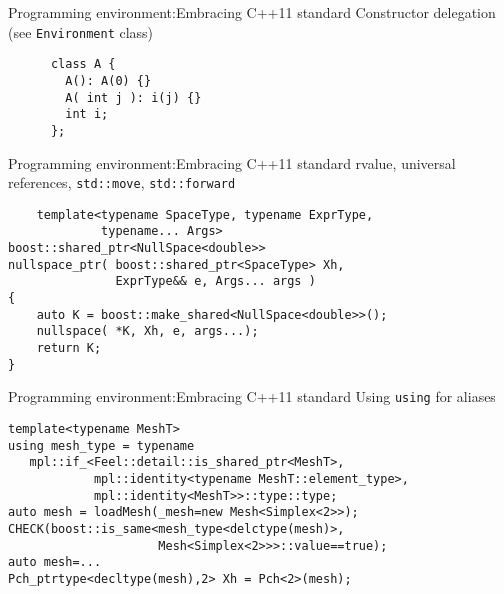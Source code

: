 \begin{frame}[fragile]{Programming environment:Embracing C++11 standard}
    Constructor delegation (see \texttt{Environment} class)

    \begin{verbatim}
      class A {
        A(): A(0) {}
        A( int j ): i(j) {}
        int i;
      };
    \end{verbatim}
\end{frame}

\begin{frame}[fragile]{Programming environment:Embracing C++11 standard }
  rvalue, universal references, \texttt{std::move},
  \texttt{std::forward}
  \begin{verbatim}
    template<typename SpaceType, typename ExprType,
             typename... Args>
boost::shared_ptr<NullSpace<double>>
nullspace_ptr( boost::shared_ptr<SpaceType> Xh,
               ExprType&& e, Args... args )
{
    auto K = boost::make_shared<NullSpace<double>>();
    nullspace( *K, Xh, e, args...);
    return K;
}
  \end{verbatim}
\end{frame}

\begin{frame}[fragile]{Programming environment:Embracing C++11 standard }
     Using \texttt{using} for aliases
\begin{verbatim}
template<typename MeshT>
using mesh_type = typename
   mpl::if_<Feel::detail::is_shared_ptr<MeshT>,
            mpl::identity<typename MeshT::element_type>,
            mpl::identity<MeshT>>::type::type;
auto mesh = loadMesh(_mesh=new Mesh<Simplex<2>>);
CHECK(boost::is_same<mesh_type<delctype(mesh)>,
                     Mesh<Simplex<2>>>::value==true);
auto mesh=...
Pch_ptrtype<decltype(mesh),2> Xh = Pch<2>(mesh);
\end{verbatim}
\end{frame}


